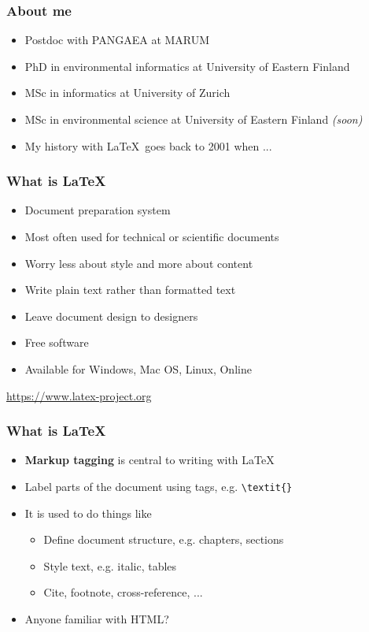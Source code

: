 \documentclass{beamer}
\begin{document}
\begin{frame}
  \frametitle{About me}
  
  \begin{itemize}
  \item Postdoc with PANGAEA at MARUM
  \item PhD in environmental informatics at University of Eastern Finland
  \item MSc in informatics at University of Zurich
  \item MSc in environmental science at University of Eastern Finland \emph{(soon)}
  \item My history with \LaTeX~goes back to 2001 when ...
  \end{itemize}

\end{frame}

\begin{frame}
  \frametitle{What is \LaTeX}
  
  \begin{itemize}
  \item Document preparation system
  \item Most often used for technical or scientific documents
  \item Worry less about style and more about content
  \item Write plain text rather than formatted text
  \item Leave document design to designers
  \item Free software
  \item Available for Windows, Mac OS, Linux, Online
  \end{itemize}
  
  \begin{flushright}
  \url{https://www.latex-project.org}
  \end{flushright}

\end{frame}


\begin{frame}[fragile]
  \frametitle{What is \LaTeX}
	
  \begin{itemize}
  \item \textbf{Markup tagging} is central to writing with \LaTeX
  \item Label parts of the document using tags, e.g. \lstinline!\textit{}!
  \item It is used to do things like
  \begin{itemize}
  \item Define document structure, e.g. chapters, sections
  \item Style text, e.g. italic, tables
  \item Cite, footnote, cross-reference, ...
  \end{itemize}
  \item Anyone familiar with HTML?
  \end{itemize}
	
\end{frame}
\end{document}
